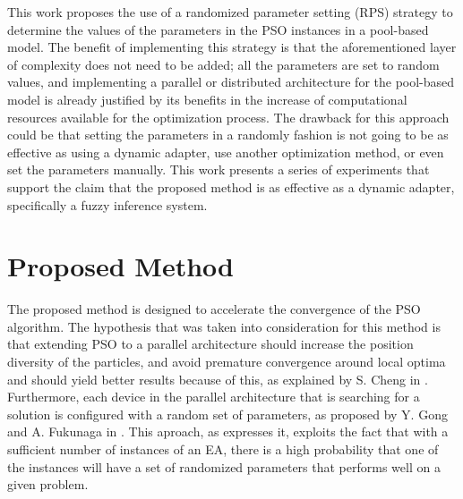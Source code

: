 This work proposes the use of a randomized parameter setting (RPS) strategy to determine the values of the parameters in the PSO instances in a pool-based model. The benefit of implementing this strategy is that the aforementioned layer of complexity does not need to be added; all the parameters are set to random values, and implementing a parallel or distributed architecture for the pool-based model is already justified by its benefits in the increase of computational resources available for the optimization process. The drawback for this approach could be that setting the parameters in a randomly fashion is not going to be as effective as using a dynamic adapter, use another optimization method, or even set the parameters manually. This work presents a series of experiments that support the claim that the proposed method is as effective as a dynamic adapter, specifically a fuzzy inference system. %



\section{Proposed Method}
\label{proposed-method}

The proposed method is designed to accelerate the convergence of the
PSO algorithm. The hypothesis that was taken into consideration for this method is
that extending PSO to a parallel architecture should increase the
position diversity of the particles, and avoid premature convergence around local optima and should yield better results because of this, as explained
by S. Cheng in \cite{cheng2013population}. Furthermore, each device in
the parallel architecture that is searching for a solution is configured with a
random set of parameters, as proposed by Y. Gong and A. Fukunaga in \cite{gong2011distributed}. This aproach, as \cite{gong2011distributed} expresses it, exploits the fact that with a sufficient number of instances of an EA, there is a high probability that one of the instances will have a set of randomized parameters that performs well on a given problem.

